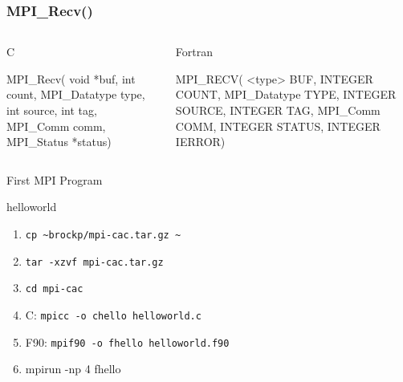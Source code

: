 \documentclass{beamer}
\begin{document}
\begin{frame}[fragile]
 \frametitle{MPI\_Recv()}
   \begin{columns}[T]
    \begin{column}{5cm}
     \begin{block}{C}
      \begin{semiverbatim}
MPI\_Recv( void   *buf,
           int  count,
  MPI\_Datatype   type,
           int source,
           int    tag,
      MPI\_Comm   comm,
    MPI\_Status  *status)
      \end{semiverbatim}
     \end{block}
    \end{column}
    \begin{column}{5cm}
     \begin{block}{Fortran}
      \begin{semiverbatim}
MPI\_RECV( <type>    BUF,
      INTEGER     COUNT,
 MPI\_Datatype      TYPE,
      INTEGER    SOURCE,
      INTEGER       TAG,
     MPI\_Comm      COMM,
      INTEGER    STATUS,
      INTEGER     IERROR)
      \end{semiverbatim}
     \end{block}
    \end{column}
   \end{columns}
\end{frame}

\begin{frame}{First MPI Program}
\begin{block}{helloworld}
 \begin{enumerate}
  \item<1->\texttt{cp \~{}brockp/mpi-cac.tar.gz \~{}}
  \item<1->\texttt{tar -xzvf mpi-cac.tar.gz}
  \item<1->\texttt{cd mpi-cac}
  \item<2-> C: \texttt{mpicc -o chello helloworld.c}
  \item<2-> F90: \texttt{mpif90 -o fhello helloworld.f90}
  \item<3-> mpirun -np 4 fhello
 \end{enumerate}
\end{block}
\end{frame}
\end{document}

